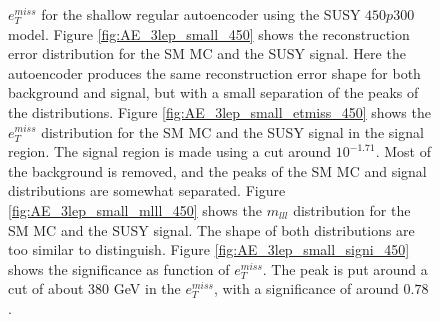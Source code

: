 \begin{figure}[h!]
{    $e_T^{miss}$ for the shallow regular autoencoder using the SUSY $450p300$ model. Figure \ref{fig:AE_3lep_small_450} shows the reconstruction error 
    distribution for the SM MC and the SUSY signal. Here the autoencoder produces the same reconstruction error shape for both background and 
    signal, but with a small separation of the peaks of the distributions. Figure \ref{fig:AE_3lep_small_etmiss_450} shows the $e_T^{miss}$ 
    distribution for the SM MC and the SUSY signal in the signal region. The signal region is made using a cut around $10^{-1.71}$. Most of 
    the background is removed, and the peaks of the SM MC and signal distributions are somewhat separated. Figure 
    \ref{fig:AE_3lep_small_mlll_450} shows the $m_{lll}$ distribution for the SM MC and the SUSY signal. 
    The shape of both distributions are too similar to distinguish. Figure \ref{fig:AE_3lep_small_signi_450} shows the significance as 
    function of $e_T^{miss}$. The peak is put around a cut of about 380 GeV in the $e_T^{miss}$, with a significance of around $0.78$.}
    \label{fig:AE_3lep_small_rec_sig_signi_450}
\end{figure}








